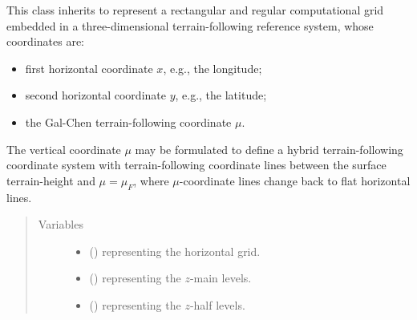 \documentclass[letterpaper,10pt,english]{sphinxmanual}
\begin{document}
\begin{fulllineitems}
\label{\detokenize{api:tasmania.grids.gal_chen.GalChen3d}}
This class inherits {\hyperref[\detokenize{api:tasmania.grids.grid_xyz.GridXYZ}]{}} to represent a rectangular and regular computational grid
embedded in a three-dimensional terrain-following reference system, whose coordinates are:
\begin{itemize}
\item {} 
first horizontal coordinate \(x\), e.g., the longitude;

\item {} 
second horizontal coordinate \(y\), e.g., the latitude;

\item {} 
the Gal-Chen terrain-following coordinate \(\mu\).

\end{itemize}

The vertical coordinate \(\mu\) may be formulated to define a hybrid terrain-following coordinate system
with terrain-following coordinate lines between the surface terrain-height and \(\mu = \mu_F\), where
\(\mu\)-coordinate lines change back to flat horizontal lines.
\begin{quote}\begin{description}
\item[{Variables}] \leavevmode\begin{itemize}
\item {} 
 () \textendash{} {\hyperref[\detokenize{api:tasmania.grids.grid_xy.GridXY}]{}} representing the horizontal grid.

\item {} 
 () \textendash{} {\hyperref[\detokenize{api:tasmania.grids.axis.Axis}]{}} representing the \(z\)-main levels.

\item {} 
 () \textendash{} {\hyperref[\detokenize{api:tasmania.grids.axis.Axis}]{}} representing the \(z\)-half levels.


\end{itemize}
\end{description}
\end{quote}
\end{fulllineitems}
\end{document}
